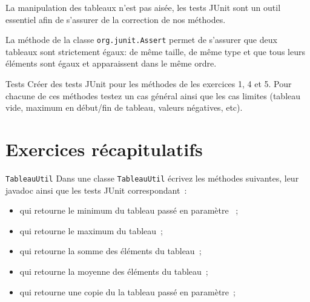 \documentclass[a4paper,11pt]{article}
\begin{document}
	La manipulation des tableaux n'est pas aisée, les tests JUnit 
	sont un outil essentiel afin de s'assurer de la correction de nos méthodes.
	
	La méthode  de la classe \texttt{org.junit.Assert}
	permet de s'assurer que deux tableaux sont strictement égaux: de même taille, 
	de même type et que tous leurs éléments sont égaux et 
	apparaissent dans le même ordre.


	\begin{Exercice}{Tests}	
		Créer des tests JUnit pour les méthodes de les exercices 1, 4 et 5. Pour chacune 
		de ces méthodes testez un cas général ainsi que les cas limites (tableau vide,
		maximum en début/fin de tableau, valeurs négatives, etc).
	\end{Exercice}



\section{Exercices récapitulatifs}

	\begin{Exercice}{\texttt{TableauUtil}}	
		Dans une classe \texttt{TableauUtil} écrivez les méthodes suivantes, leur 
		javadoc ainsi que les tests JUnit correspondant~:
		\begin{itemize}
			\item {} qui retourne le minimum
				du tableau passé en paramètre ~;
			\item {} qui retourne le maximum
				du tableau~;
			\item {} qui retourne la somme
				des éléments du tableau~;
			\item {} qui retourne la
				 moyenne des éléments du tableau~;
			\item {} qui retourne une
			 copie du la tableau passé en paramètre~;
		\end{itemize}
	\end{Exercice}
\end{document}
